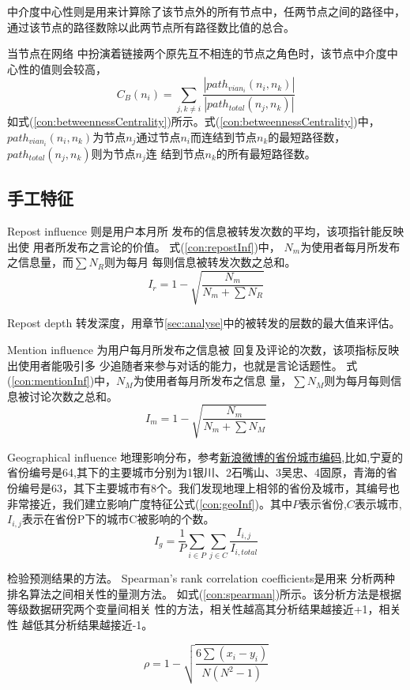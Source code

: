 \begin{theorem}[中介度中心性]
中介度中心性则是用来计算除了该节点外的所有节点中，任两节点之间的路径中，通过该节点的路径数除以此两节点所有路径数比值的总合。
\end{theorem}
当节点在网络 中扮演着链接两个原先互不相连的节点之角色时，该节点中介度中心性的值则会较高，
\begin{equation}
C_B(n_i)=\sum_{j,k\neq i}\frac{|path_{via n_i}(n_i,n_k)|}{|path_{total}(n_j,n_k)|}
\label{con:betweennessCentrality}
\end{equation}
如式(\ref{con:betweennessCentrality})所示。式(\ref{con:betweennessCentrality})中，$path_{via n_i}(n_i,n_k)$为节点$n_j$通过节点$n_i$而连结到节点$n_k$的最短路径数，$path_{total}(n_j,n_k)$则为节点$n_j$连 结到节点$n_k$的所有最短路径数。





\subsection{手工特征}

Repost influence 则是用户本月所 发布的信息被转发次数的平均，该项指针能反映出使 用者所发布之言论的价值。
式(\ref{con:repostInf})中，
$N_m$为使用者每月所发布之信息量，而$\sum N_R$则为每月 每则信息被转发次数之总和。
\begin{equation}
I_r=1-\sqrt{\frac{N_m}{N_m+\sum N_R}}
\label{con:repostInf}
\end{equation}

Repost depth 转发深度，用章节\ref{sec:analyse}中的被转发的层数的最大值来评估。


Mention influence 为用户每月所发布之信息被 回复及评论的次数，该项指标反映出使用者能吸引多 少追随者来参与对话的能力，也就是言论话题性。
式(\ref{con:mentionInf})中，$N_M$为使用者每月所发布之信息
量，$\sum N_M$则为每月每则信息被讨论次数之总和。
\begin{equation}
I_m=1-\sqrt{\frac{N_m}{N_m+\sum N_M}}
\label{con:mentionInf}
\end{equation}


Geographical influence 地理影响分布，参考\href{https://open.weibo.com/wiki/%E7%9C%81%E4%BB%BD%E5%9F%8E%E5%B8%82%E7%BC%96%E7%A0%81%E8%A1%A8}{新浪微博的省份城市编码},比如,宁夏的省份编号是64,其下的主要城市分别为1银川、2石嘴山、3吴忠、4固原，青海的省份编号是63，其下主要城市有8个。我们发现地理上相邻的省份及城市，其编号也非常接近，我们建立影响广度特征公式(\ref{con:geoInf})。其中$P$表示省份,$C$表示城市,$I_{i,j}$表示在省份P下的城市C被影响的个数。
\begin{equation}
I_g=\frac{1}{P}\sum_{i\in P}\sum_{j\in C}\frac{I_{i,j}}{I_{i,total}}
\label{con:geoInf}
\end{equation}


检验预测结果的方法。
Spearman’s rank correlation coefficients是用来 分析两种排名算法之间相关性的量测方法。
如式(\ref{con:spearman})所示。该分析方法是根据等级数据研究两个变量间相关 性的方法，相关性越高其分析结果越接近+1，相关性 越低其分析结果越接近-1。

\begin{equation}
\rho=1-\sqrt{\frac{6\sum (x_i-y_i)}{N(N^2-1)}}
\label{con:spearman}
\end{equation}
